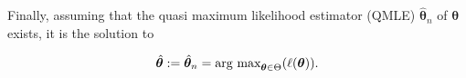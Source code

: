 Finally, assuming that the quasi maximum likelihood estimator (QMLE) $\hat{\bm{\theta}}_n$ of $\bm{\theta}$ exists, it is the solution to 

\begin{equation}
\hat{\bm{\theta}}:= \hat{\bm{\theta}}_n = \text{arg max}_{\bm{\theta} \in \Theta} (\ell(\bm{\theta})). 
\label{eq:ingarch qmle}
\end{equation}
